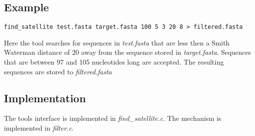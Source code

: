 \subsection{Example}
\begin{lstlisting}
find_satellite test.fasta target.fasta 100 5 3 20 8 > filtered.fasta
\end{lstlisting}
Here the tool searches for sequences in \emph{test.fasta} that are
less then a Smith Waterman distance of 20 away from the sequence
stored in \emph{target.fasta}. Sequences that are between 97 and 105
nucleotides long are accepted. The resulting sequences are stored to
\emph{filtered.fasta}


\subsection{Implementation}
The tools interface is implemented in \emph{find\_satellite.c}. The
mechanism is implemented in \emph{filter.c}.


    
